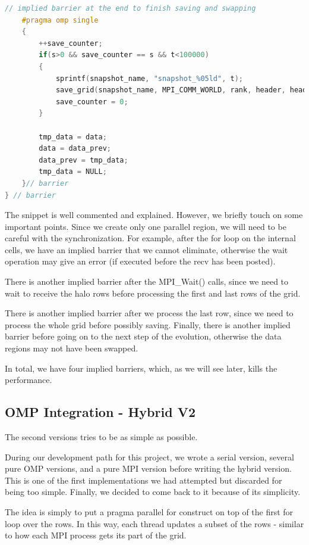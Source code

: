 \documentclass{report}
\begin{document}
\begin{lstlisting}[language=C++]
    // implied barrier at the end to finish saving and swapping
    #pragma omp single
    {
        ++save_counter;
        if(s>0 && save_counter == s && t<100000)
        {
            sprintf(snapshot_name, "snapshot_%05ld", t);
            save_grid(snapshot_name, MPI_COMM_WORLD, rank, header, header_size, my_total_file_offset, data, my_rows, cols);
            save_counter = 0;
        }

        tmp_data = data;
        data = data_prev;
        data_prev = tmp_data;
        tmp_data = NULL;
    }// barrier
} // barrier
\end{lstlisting}

The snippet is well commented and explained. However, we briefly touch on some 
important points. Since we create only one parallel region, we will need to 
be careful with the synchronization. For example, after the for loop on the 
internal cells, we have an implied barrier that we cannot eliminate, otherwise the 
wait operation may give an error (if executed before the recv has been posted).

There is another implied barrier after the MPI\_Wait() calls, since we need to wait 
to receive the halo rows before processing the first and last rows of the grid.

There is another implied barrier after we process the last row, since 
we need to process the whole grid before possibly saving. Finally, there is another 
implied barrier before going on to the next step of the evolution, otherwise the 
data regions may not have been swapped.

In total, we have four implied barriers, which, as we will see later, kills  
the performance.

\subsection{OMP Integration - Hybrid V2}

The second versions tries to be as simple as possible. 

During our development path for this project, we wrote a serial version, several
pure OMP versions, and a pure MPI version before writing the hybrid version. 
This is one of the first implementations we had attempted but discarded for being 
too simple. Finally, we decided to come back to it because of its simplicity. 

The idea is simply to put a pragma parallel for construct on top of the 
first for loop over the rows. In this way, each thread updates a subset of the 
rows - similar to how each MPI process gets its part of the grid.
\end{document}
